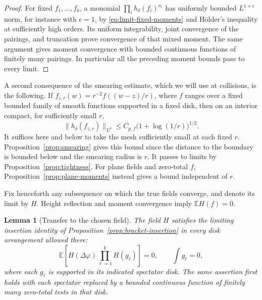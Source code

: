 \documentclass[11pt]{article}
\newtheorem{lemma}[theorem]{Lemma}
\theoremstyle{definition}
\theoremstyle{remark}
\numberwithin{equation}{section}
\begin{document}
\begin{proof}
For fixed \(f_1,\ldots,f_k\), a monomial
\(\prod_i h_\delta(f_i)^{a_i}\) has uniformly bounded \(L^{1+\epsilon}\)
norm, for instance with \(\epsilon=1\), by
\eqref{eq:limit-fixed-moments} and H\"older's inequality at sufficiently
high orders.  Its uniform integrability, joint convergence of the
pairings, and truncation prove convergence of that mixed moment.
The same argument gives moment convergence with bounded continuous
functions of finitely many pairings.  In particular all the preceding
moment bounds pass to every limit.
\end{proof}

A second consequence of the smearing estimate, which we will use at
collisions, is the following.  If
\(f_{z,r}(w)=r^{-2}f((w-z)/r)\), where \(f\) ranges over a fixed bounded
family of smooth functions supported in a fixed disk, then on an
interior compact, for sufficiently small \(r\),
\begin{equation}
 \|h_\delta(f_{z,r})\|_{L^p}
 \le C_{p,f}\bigl(1+\log(1/r)\bigr)^{1/2}.
 \label{eq:limit-small-moments}
\end{equation}
It suffices here and below to take the mesh sufficiently small at each
fixed \(r\).  Proposition~\ref{prop:smearing} gives this bound since
the distance to the boundary is bounded below and the smearing radius
is \(r\).  It passes to limits by Proposition~\ref{prop:tightness}.
For plane fields and zero-total \(f\), Proposition~\ref{prop:plane-moments}
instead gives a bound independent of \(r\).

Fix henceforth any subsequence on which the true fields converge,
and denote its limit by \(H\).  Height reflection and moment
convergence imply \(\mathbb E H(f)=0\).

\begin{lemma}[Transfer to the chosen field]
\label{limit:transfer}
The field \(H\) satisfies the limiting insertion identity of
Proposition~\ref{prop:bracket-insertion} in every disk arrangement
allowed there:
\begin{equation}
 \mathbb E\left[H(\Delta\varphi)
          \prod_{\ell=1}^k H(g_\ell)\right]=0,
 \qquad \int g_\ell=0,
 \label{eq:limit-insertion}
\end{equation}
where each \(g_\ell\) is supported in its indicated spectator disk.
The same assertion first holds with each spectator replaced by a
bounded continuous function of finitely many zero-total tests in that
disk.
\end{lemma}
\end{document}
